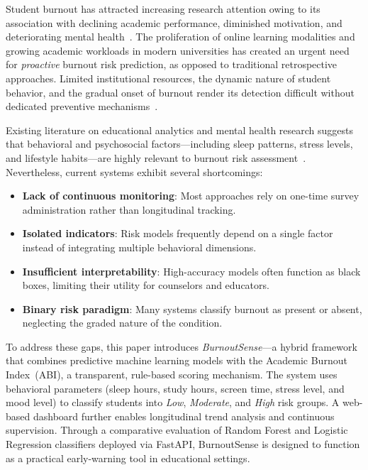 \documentclass[conference]{IEEEtran}
\begin{document}
Student burnout has attracted increasing research attention owing to its association with declining academic performance, diminished motivation, and deteriorating mental health~\cite{burnout_overview, edu_mental_health}. The proliferation of online learning modalities and growing academic workloads in modern universities has created an urgent need for \emph{proactive} burnout risk prediction, as opposed to traditional retrospective approaches. Limited institutional resources, the dynamic nature of student behavior, and the gradual onset of burnout render its detection difficult without dedicated preventive mechanisms~\cite{early_warning_higher_ed}.

Existing literature on educational analytics and mental health research suggests that behavioral and psychosocial factors---including sleep patterns, stress levels, and lifestyle habits---are highly relevant to burnout risk assessment~\cite{edm_survey, student_stress_ml}. Nevertheless, current systems exhibit several shortcomings:

\begin{itemize}[leftmargin=*]
    \item \textbf{Lack of continuous monitoring}: Most approaches rely on one-time survey administration rather than longitudinal tracking.
    \item \textbf{Isolated indicators}: Risk models frequently depend on a single factor instead of integrating multiple behavioral dimensions.
    \item \textbf{Insufficient interpretability}: High-accuracy models often function as black boxes, limiting their utility for counselors and educators.
    \item \textbf{Binary risk paradigm}: Many systems classify burnout as present or absent, neglecting the graded nature of the condition.
\end{itemize}

To address these gaps, this paper introduces \textit{BurnoutSense}---a hybrid framework that combines predictive machine learning models with the Academic Burnout Index~(ABI), a transparent, rule-based scoring mechanism. The system uses behavioral parameters (sleep hours, study hours, screen time, stress level, and mood level) to classify students into \textit{Low}, \textit{Moderate}, and \textit{High} risk groups. A web-based dashboard further enables longitudinal trend analysis and continuous supervision. Through a comparative evaluation of Random Forest and Logistic Regression classifiers deployed via FastAPI, BurnoutSense is designed to function as a practical early-warning tool in educational settings.
\end{document}
